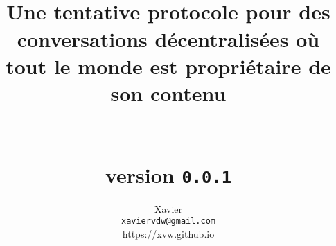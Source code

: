 \documentclass[a4paper,10pt]{article}
\title{
  \bsc{Phragment}\\
  \large{
    Une tentative protocole pour des conversations décentralisées où tout le monde
    est propriétaire de son contenu\\~\\~\\
    \textbf{version} \texttt{0.0.1}
  }
}
\date{}
\author{
  Xavier \bsc{Van de Woestyne}\\
  \texttt{xaviervdw@gmail.com}\\
  \small{https://xvw.github.io}
}
\begin{document}
\maketitle

\begin{abstract}  
\end{abstract}



\newpage


\end{document}
